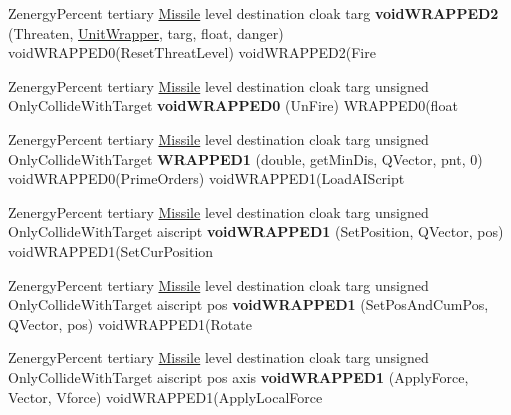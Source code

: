\begin{DoxyCompactItemize}
\item 
Zenergy\+Percent tertiary \hyperlink{classMissile}{Missile} level destination cloak targ {\bfseries void\+W\+R\+A\+P\+P\+E\+D2} (Threaten, \hyperlink{classUnitWrapper}{Unit\+Wrapper}, targ, float, danger) void\+W\+R\+A\+P\+P\+E\+D0(Reset\+Threat\+Level) void\+W\+R\+A\+P\+P\+E\+D2(Fire\hypertarget{classUnitWrapper_a3fd7f1176407eeeb6c5f092f348d3318}{}\label{classUnitWrapper_a3fd7f1176407eeeb6c5f092f348d3318}

\item 
Zenergy\+Percent tertiary \hyperlink{classMissile}{Missile} level destination cloak targ unsigned Only\+Collide\+With\+Target {\bfseries void\+W\+R\+A\+P\+P\+E\+D0} (Un\+Fire) W\+R\+A\+P\+P\+E\+D0(float\hypertarget{classUnitWrapper_adfdf74516a5245dfaf9fccbd5a9fd7e2}{}\label{classUnitWrapper_adfdf74516a5245dfaf9fccbd5a9fd7e2}

\item 
Zenergy\+Percent tertiary \hyperlink{classMissile}{Missile} level destination cloak targ unsigned Only\+Collide\+With\+Target {\bfseries W\+R\+A\+P\+P\+E\+D1} (double, get\+Min\+Dis, Q\+Vector, pnt, 0) void\+W\+R\+A\+P\+P\+E\+D0(Prime\+Orders) void\+W\+R\+A\+P\+P\+E\+D1(Load\+A\+I\+Script\hypertarget{classUnitWrapper_a3d82dacc93271ce1b602619f0ac36c61}{}\label{classUnitWrapper_a3d82dacc93271ce1b602619f0ac36c61}

\item 
Zenergy\+Percent tertiary \hyperlink{classMissile}{Missile} level destination cloak targ unsigned Only\+Collide\+With\+Target aiscript {\bfseries void\+W\+R\+A\+P\+P\+E\+D1} (Set\+Position, Q\+Vector, pos) void\+W\+R\+A\+P\+P\+E\+D1(Set\+Cur\+Position\hypertarget{classUnitWrapper_a8e177bed0722672979cdb4ce581cb39c}{}\label{classUnitWrapper_a8e177bed0722672979cdb4ce581cb39c}

\item 
Zenergy\+Percent tertiary \hyperlink{classMissile}{Missile} level destination cloak targ unsigned Only\+Collide\+With\+Target aiscript pos {\bfseries void\+W\+R\+A\+P\+P\+E\+D1} (Set\+Pos\+And\+Cum\+Pos, Q\+Vector, pos) void\+W\+R\+A\+P\+P\+E\+D1(Rotate\hypertarget{classUnitWrapper_af1b71b600a650a67d1a4ca1ecffc5704}{}\label{classUnitWrapper_af1b71b600a650a67d1a4ca1ecffc5704}

\item 
Zenergy\+Percent tertiary \hyperlink{classMissile}{Missile} level destination cloak targ unsigned Only\+Collide\+With\+Target aiscript pos axis {\bfseries void\+W\+R\+A\+P\+P\+E\+D1} (Apply\+Force, Vector, Vforce) void\+W\+R\+A\+P\+P\+E\+D1(Apply\+Local\+Force\hypertarget{classUnitWrapper_a10435f29644dda2a085a2c082f23c12d}{}\label{classUnitWrapper_a10435f29644dda2a085a2c082f23c12d}


\end{DoxyCompactItemize}
